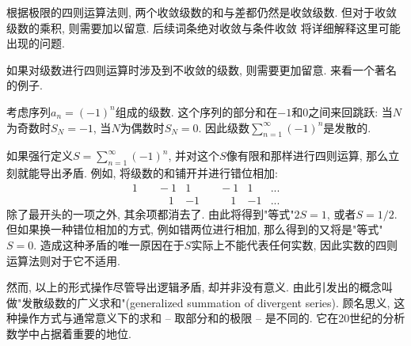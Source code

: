根据极限的四则运算法则, 两个收敛级数的和与差都仍然是收敛级数. 但对于收敛级数的乘积, 则需要加以留意. 后续词条绝对收敛与条件收敛 将详细解释这里可能出现的问题.

如果对级数进行四则运算时涉及到不收敛的级数, 则需要更加留意. 来看一个著名的例子.

\begin{example}{}
考虑序列$a_n=(-1)^n$组成的级数. 这个序列的部分和在$-1$和$0$之间来回跳跃: 当$N$为奇数时$S_N=-1$, 当$N$为偶数时$S_N=0$. 因此级数$\sum_{n=1}^\infty(-1)^n$是发散的. 

如果强行定义$S=\sum_{n=1}^\infty(-1)^n$, 并对这个$S$像有限和那样进行四则运算, 那么立刻就能导出矛盾. 例如, 将级数的和铺开并进行错位相加:
$$
\begin{aligned}
1 & \quad-1 & 1 & \quad-1 & 1 &...\\
  & \quad\quad1 & -1 & \quad\quad1 & -1 &...
\end{aligned}
$$
除了最开头的一项之外, 其余项都消去了. 由此将得到"等式"$2S=1$, 或者$S=1/2$. 但如果换一种错位相加的方式, 例如错两位进行相加, 那么得到的又将是"等式"$S=0$. 造成这种矛盾的唯一原因在于$S$实际上不能代表任何实数, 因此实数的四则运算法则对于它不适用.

然而, 以上的形式操作尽管导出逻辑矛盾, 却并非没有意义. 由此引发出的概念叫做"发散级数的广义求和"(generalized summation of divergent series). 顾名思义, 这种操作方式与通常意义下的求和 -- 取部分和的极限 -- 是不同的. 它在20世纪的分析数学中占据着重要的地位.
\end{example}